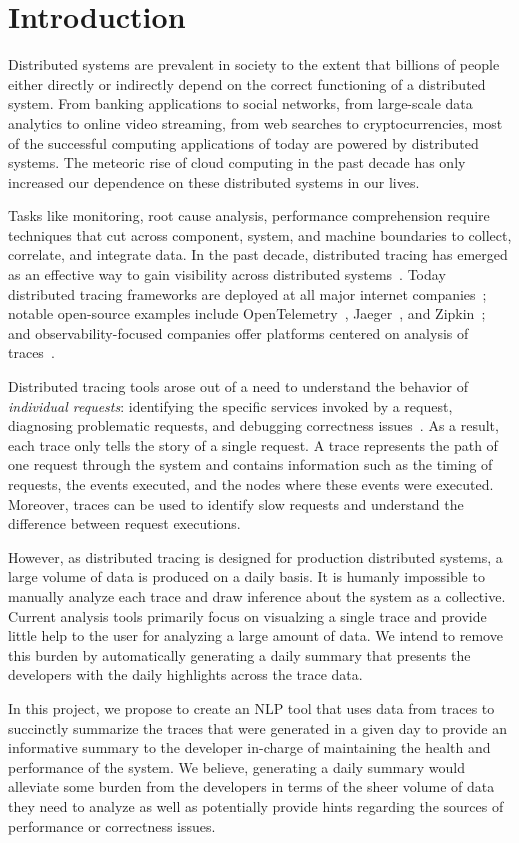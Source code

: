 \section{Introduction}

Distributed systems are prevalent in society to the extent that billions of people either directly or 
indirectly depend on the correct functioning of a distributed system. From banking applications to social
networks, from large-scale data analytics to online video streaming, from web searches to cryptocurrencies,
most of the successful computing applications of today are powered by distributed systems.
The meteoric rise of cloud computing in the past decade has only increased our dependence on these
distributed systems in our lives.

Tasks like monitoring, root cause analysis, performance comprehension require techniques that cut across component,
system, and machine boundaries to collect, correlate, and integrate data. In the past decade, distributed tracing has emerged as an effective way to gain visibility across distributed systems~\cite{mace2015pivot,mace2018universal,fonseca2007xtrace}.  
Today distributed tracing frameworks are deployed at all major internet companies~\cite{kaldor2017canopy,sigelman2010dapper,netflixtracing}; 
notable open-source examples include OpenTelemetry~\cite{opentelemetry}, Jaeger~\cite{jaeger}, and Zipkin~\cite{zipkin}; and 
observability-focused companies offer platforms centered on analysis of traces~\cite{lightstep}.

Distributed tracing tools arose out of a need to understand the behavior of \emph{individual requests}: identifying the specific services 
invoked by a request, diagnosing problematic requests, and debugging correctness issues~\cite{fonseca2007xtrace,sigelman2010dapper,macewe}.
As a result, each trace only tells the story of a single request.
A trace represents the path of one request through the system and contains information such as the timing of requests, 
the events executed, and the nodes where these events were executed. Moreover, traces can be used
to identify slow requests and understand the difference between request executions. 

However, as distributed tracing is designed for production distributed systems, a large volume of data
is produced on a daily basis. It is humanly impossible to manually analyze each trace and draw inference
about the system as a collective. Current analysis tools primarily focus on visualzing a single trace
and provide little help to the user for analyzing a large amount of data. We intend to remove this burden
by automatically generating a daily summary that presents the developers with the daily highlights
across the trace data.

In this project, we propose to create an NLP tool that uses data from traces to succinctly summarize
the traces that were generated in a given day to provide an informative summary to the developer
in-charge of maintaining the health and performance of the system. We believe, generating a daily summary
would alleviate some burden from the developers in terms of the sheer volume of data they need to analyze
as well as potentially provide hints regarding the sources of performance or correctness issues.